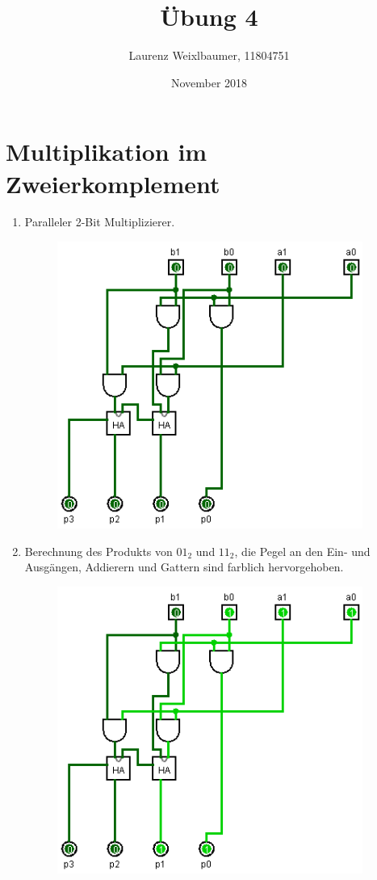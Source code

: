\documentclass{article}
\title{Übung 4}
\author{Laurenz Weixlbaumer, 11804751}
\date{November 2018}
\begin{document}
\maketitle

\section{Multiplikation im Zweierkomplement}

\begin{enumerate}[label=(\alph*)]

\item Paralleler 2-Bit Multiplizierer.

\begin{figure}[h]
\begin{center}
    \includegraphics[width=10cm]{multiplier_prl_circuit.png}
\end{center}
\end{figure}

\clearpage

\item Berechnung des Produkts von $01_2$ und $11_2$, die Pegel an den Ein- und Ausgängen, Addierern und Gattern sind farblich hervorgehoben.

\begin{figure}[h]
\begin{center}
    \includegraphics[width=10cm]{multiplier_prl_circuit_marked.png}
\end{center}
\end{figure}

\end{enumerate}
\end{document}
